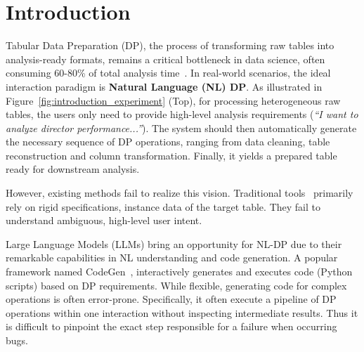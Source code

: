 \section{Introduction}
\label{sec:intro}

% 



Tabular Data Preparation (DP), the process of transforming raw tables into analysis-ready formats, remains a critical bottleneck in data science, often consuming 60-80\% of total analysis time~\cite{dasu2003exploratory}. 
In real-world scenarios, the ideal interaction paradigm is \textbf{Natural Language (NL) \nlwhat DP}. As illustrated in Figure~\ref{fig:introduction_experiment} (Top),
for processing heterogeneous raw tables, the users only need to provide  high-level analysis requirements (\eg \textit{``I want to analyze director performance...''}). The system should then automatically generate the necessary sequence of DP operations, ranging from data cleaning, table reconstruction and column transformation. Finally, it yields a prepared table ready for downstream analysis.

However, existing methods fail to realize this vision. Traditional tools~\cite{barowy2015flashrelate, singh2016blinkfill, he2018transform, gulwani2012spreadsheet, jin2017foofah, heer2015predictive} primarily rely on rigid specifications, \eg instance data of the target table. They fail to understand ambiguous, high-level user intent. 

Large Language Models (LLMs) bring an opportunity for NL-\nlwhat DP due to their remarkable capabilities in NL understanding and code generation. 
A popular framework named CodeGen~\cite{sapkota2025vibe}, interactively generates and executes code (\eg Python scripts) based on DP requirements.
While flexible, generating code for complex operations is often error-prone.
Specifically, it often execute a pipeline of DP operations within one interaction without inspecting intermediate results. Thus it is difficult to pinpoint the exact step responsible for a failure when occurring bugs.

